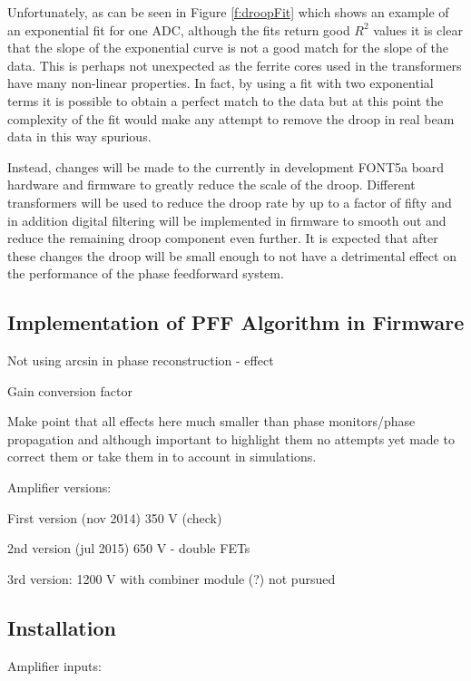 Unfortunately, as can be seen in Figure \ref{f:droopFit} which shows an example of an exponential fit for one ADC, although the fits return good \(R^{2}\) values it is clear that the slope of the exponential curve is not a good match for the slope of the data. This is perhaps not unexpected as the ferrite cores used in the transformers have many non-linear properties. In fact, by using a fit with two exponential terms it is possible to obtain a perfect match to the data but at this point the complexity of the fit would make any attempt to remove the droop in real beam data in this way spurious.

Instead, changes will be made to the currently in development FONT5a board hardware and firmware to greatly reduce the scale of the droop. Different transformers will be used to reduce the droop rate by up to a factor of fifty and in addition digital filtering will be implemented in firmware to smooth out and reduce the remaining droop component even further. It is expected that after these changes the droop will be small enough to not have a detrimental effect on the performance of the phase feedforward system. 

\subsection{Implementation of PFF Algorithm in Firmware}
\label{ss:pffFirmware}

Not using arcsin in phase reconstruction - effect

Gain conversion factor


Make point that all effects here much smaller than phase monitors/phase propagation and although important to highlight them no attempts yet made to correct them or take them in to account in simulations.

Amplifier versions:

First version (nov 2014) 350 V (check)

2nd version  (jul 2015) 650 V - double FETs

3rd version: 1200 V with combiner module (?) not pursued

\subsection{Installation}
\label{ss:ampInstallation}


Amplifier inputs:

